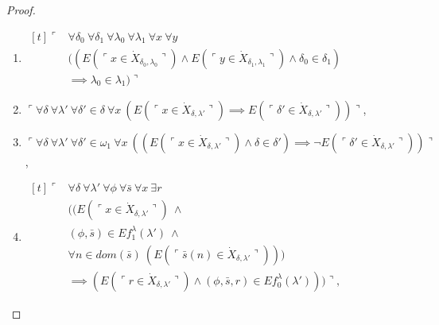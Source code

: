 \documentclass[12pt]{article}
\numberwithin{equation}{section}
\begin{document}
\begin{proof}
\begin{defi}
\begin{enumerate}[label=(S\arabic*)$_{\lambda}$, leftmargin=40pt]
    \item\label{c4}
    \!
    $\begin{aligned}[t]
        \ulcorner & \forall \delta_0 \ \forall \delta_1 \ \forall \lambda_0 \ \forall \lambda_1 \ \forall x \ \forall y \\
        & ((E(\ulcorner x \in \dot{X}_{\delta_0, \lambda_0} \urcorner) \wedge E(\ulcorner y \in \dot{X}_{\delta_1, \lambda_1} \urcorner) \wedge \delta_0 \in \delta_1) \\
        & \implies \lambda_0 \in \lambda_1) \urcorner
    \end{aligned}$

    \item\label{c5} $\ulcorner \forall \delta \ \forall \lambda' \ \forall \delta' \in \delta \ \forall x \ (E(\ulcorner x \in \dot{X}_{\delta, \lambda'} \urcorner) \implies E(\ulcorner \delta' \in \dot{X}_{\delta, \lambda'} \urcorner)) \urcorner$, 
    
    \item\label{c6} $\ulcorner \forall \delta \ \forall \lambda' \ \forall \delta' \in \omega_1 \ \forall x \ ((E(\ulcorner x \in \dot{X}_{\delta, \lambda'} \urcorner) \wedge \delta \in \delta') \implies \neg E(\ulcorner \delta' \in \dot{X}_{\delta, \lambda'} \urcorner)) \urcorner$, 
    
    \item\label{c7} 
    \!
    $\begin{aligned}[t]
        \ulcorner & \forall \delta \ \forall \lambda' \ \forall \phi \ \forall \bar{s} \ \forall x \ \exists r \\
        & ((E(\ulcorner x \in \dot{X}_{\delta, \lambda'} \urcorner) \ \wedge \ \\
        & (\phi, \bar{s}) \in Ef_1^{\lambda}(\lambda') \ \wedge \\
        & \forall n \in dom(\bar{s}) \ (E(\ulcorner \bar{s}(n) \in \dot{X}_{\delta, \lambda'} \urcorner))) \\
        & \implies (E(\ulcorner r \in \dot{X}_{\delta, \lambda'} \urcorner) \wedge (\phi, \bar{s}, r) \in Ef_0^{\lambda}(\lambda'))) \urcorner,
    \end{aligned}$
    

\end{enumerate}
\end{defi}
\end{proof}
\end{document}
